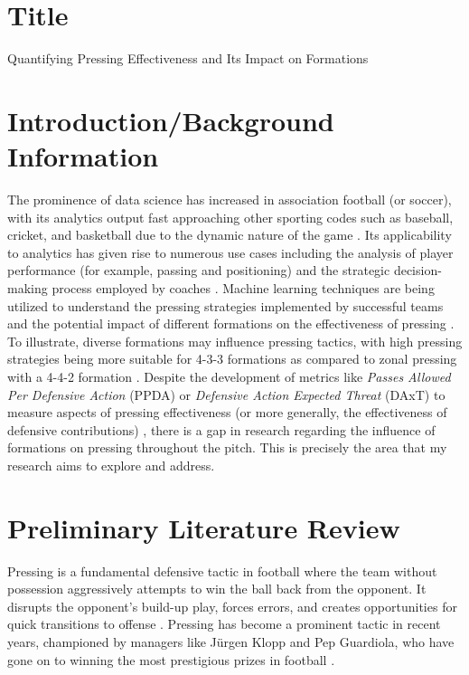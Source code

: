 \documentclass[12pt]{article}
\begin{document}
\tableofcontents
\pagebreak
\section{Title}
Quantifying Pressing Effectiveness and Its Impact on Formations

\section{Introduction/Background Information}

The prominence of data science has increased in association football (or soccer), with its analytics output fast approaching other sporting codes such as baseball, cricket, and basketball due to the dynamic nature of the game \cite{decroos2020soccer}. Its applicability to analytics has given rise to numerous use cases including the analysis of player performance (for example, passing and positioning) and the strategic decision-making process employed by coaches \cite{datacamp2022}\cite{goes2021unlocking}. Machine learning techniques are being utilized to understand the pressing strategies implemented by successful teams and the potential impact of different formations on the effectiveness of pressing \cite{rico2023machine}\cite{bauer2021data}. To illustrate, diverse formations may influence pressing tactics, with high pressing strategies being more suitable for 4-3-3 formations as compared to zonal pressing with a 4-4-2 formation \cite{coachesvoice}. Despite the development of metrics like \textit{Passes Allowed Per Defensive Action} (PPDA) or \textit{Defensive Action Expected Threat} (DAxT) to measure aspects of pressing effectiveness (or more generally, the effectiveness of defensive contributions)  \cite{ppda}\cite{merhej2021happened}, there is a gap in research regarding the influence of formations on pressing throughout the pitch. This is precisely the area that my research aims to explore and address. 

\section{Preliminary Literature Review}

Pressing is a fundamental defensive tactic in football where the team without possession aggressively attempts to win the ball back from the opponent. It disrupts the opponent's build-up play, forces errors, and creates opportunities for quick transitions to offense \cite{soccersourcecoaching}. Pressing has become a prominent tactic in recent years, championed by managers like Jürgen Klopp and Pep Guardiola, who have gone on to winning the most prestigious prizes in football \cite{counterstats2018}.
\end{document}

